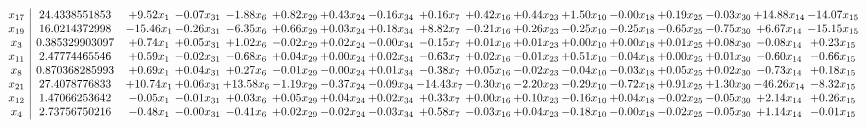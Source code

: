 \documentclass[9pt]{article}
\begin{document}
\[\begin{array}{c| c c@{\hskip 2pt} c@{\hskip 2pt} c@{\hskip 2pt} c@{\hskip 2pt} c@{\hskip 2pt} c@{\hskip 2pt} c@{\hskip 2pt} c@{\hskip 2pt} c@{\hskip 2pt} c@{\hskip 2pt} c@{\hskip 2pt} c@{\hskip 2pt} c@{\hskip 2pt} c@{\hskip 2pt} c@{\hskip 2pt} }
 x_{17}   &  24.4338551853 & +  9.52 x_{1} & -0.07 x_{31} & -1.88 x_{6} & +  0.82 x_{29} & +  0.43 x_{24} & -0.16 x_{34} & +  0.16 x_{7} & +  0.42 x_{16} & +  0.44 x_{23} & +  1.50 x_{10} & -0.00 x_{18} & +  0.19 x_{25} & -0.03 x_{30} & + 14.88 x_{14} & -14.07 x_{15}\\
 x_{19}   &  16.0214372998 & -15.46 x_{1} & -0.26 x_{31} & -6.35 x_{6} & +  0.66 x_{29} & +  0.03 x_{24} & +  0.18 x_{34} & +  8.82 x_{7} & -0.21 x_{16} & +  0.26 x_{23} & -0.25 x_{10} & -0.25 x_{18} & -0.65 x_{25} & -0.75 x_{30} & +  6.67 x_{14} & -15.15 x_{15}\\
 x_{3}   &  0.385329903097 & +  0.74 x_{1} & +  0.05 x_{31} & +  1.02 x_{6} & -0.02 x_{29} & +  0.02 x_{24} & -0.00 x_{34} & -0.15 x_{7} & +  0.01 x_{16} & +  0.01 x_{23} & +  0.00 x_{10} & +  0.00 x_{18} & +  0.01 x_{25} & +  0.08 x_{30} & -0.08 x_{14} & +  0.23 x_{15}\\
 x_{11}   &  2.47774465546 & +  0.59 x_{1} & -0.02 x_{31} & -0.68 x_{6} & +  0.04 x_{29} & +  0.00 x_{24} & +  0.02 x_{34} & -0.63 x_{7} & +  0.02 x_{16} & -0.01 x_{23} & +  0.51 x_{10} & -0.04 x_{18} & +  0.00 x_{25} & +  0.01 x_{30} & -0.60 x_{14} & -0.66 x_{15}\\
 x_{8}   &  0.870368285993 & +  0.69 x_{1} & +  0.04 x_{31} & +  0.27 x_{6} & -0.01 x_{29} & -0.00 x_{24} & +  0.01 x_{34} & -0.38 x_{7} & +  0.05 x_{16} & -0.02 x_{23} & -0.04 x_{10} & -0.03 x_{18} & +  0.05 x_{25} & +  0.02 x_{30} & -0.73 x_{14} & +  0.18 x_{15}\\
 x_{21}   &  27.4078776833 & + 10.74 x_{1} & +  0.06 x_{31} & + 13.58 x_{6} & -1.19 x_{29} & -0.37 x_{24} & -0.09 x_{34} & -14.43 x_{7} & -0.30 x_{16} & -2.20 x_{23} & -0.29 x_{10} & -0.72 x_{18} & +  0.91 x_{25} & +  1.30 x_{30} & -46.26 x_{14} & -8.32 x_{15}\\
 x_{12}   &  1.47066253642 & -0.05 x_{1} & -0.01 x_{31} & +  0.03 x_{6} & +  0.05 x_{29} & +  0.04 x_{24} & +  0.02 x_{34} & +  0.33 x_{7} & +  0.00 x_{16} & +  0.10 x_{23} & -0.16 x_{10} & +  0.04 x_{18} & -0.02 x_{25} & -0.05 x_{30} & +  2.14 x_{14} & +  0.26 x_{15}\\
 x_{4}   &  2.73756750216 & -0.48 x_{1} & -0.00 x_{31} & -0.41 x_{6} & +  0.02 x_{29} & -0.02 x_{24} & -0.03 x_{34} & +  0.58 x_{7} & -0.03 x_{16} & +  0.04 x_{23} & -0.18 x_{10} & -0.00 x_{18} & -0.02 x_{25} & -0.05 x_{30} & +  1.14 x_{14} & -0.01 x_{15}\\

\end{array}\]
\end{document}
